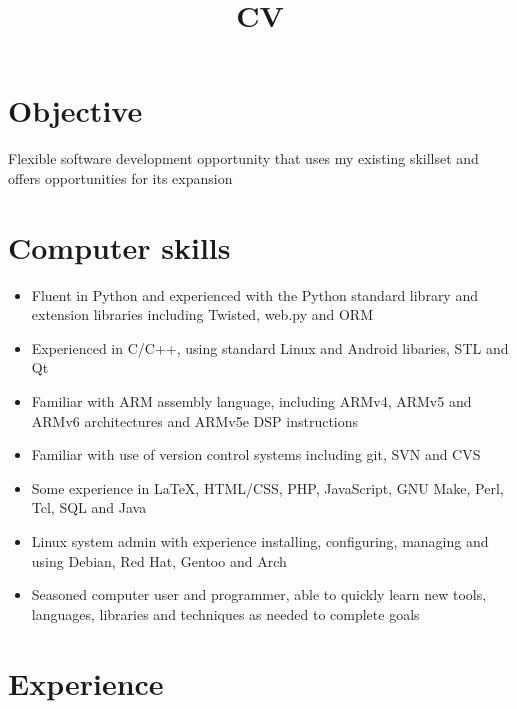 \documentclass[11pt,a4paper,sans]{moderncv}
\title{CV}%
\begin{document}
%
\thispagestyle{empty}%
\makecvtitle%
\section{Objective}%
Flexible software development opportunity that uses my existing skillset and offers opportunities for its expansion%
\section{Computer skills}%
\begin{itemize}%
	\item Fluent in Python and experienced with the Python standard library and extension libraries including Twisted, web.py and ORM%
	\item Experienced in C/C++, using standard Linux and Android libaries, STL and Qt%
	\item Familiar with ARM assembly language, including ARMv4, ARMv5 and ARMv6 architectures and ARMv5e DSP instructions%
	\item Familiar with use of version control systems including git, SVN and CVS%
	\item Some experience in \LaTeX, HTML/CSS, PHP, JavaScript, GNU Make, Perl, Tcl, SQL and Java%
	\item Linux system admin with experience installing, configuring, managing and using Debian, Red Hat, Gentoo and Arch%
	\item Seasoned computer user and programmer, able to quickly learn new tools, languages, libraries and techniques as needed to complete goals%
\end{itemize}%
\section{Experience}%
\end{document}
